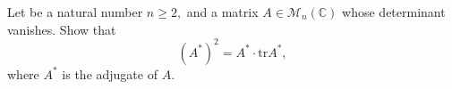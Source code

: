 Let be a natural number $ n\ge 2, $ and a matrix $ A\in\mathcal{M}_n\left( \mathbb{C} \right) $ whose determinant vanishes. Show that
$$ \left( A^* \right)^2 =A^*\cdot\text{tr} A^*, $$where $ A^* $ is the adjugate of $ A. $